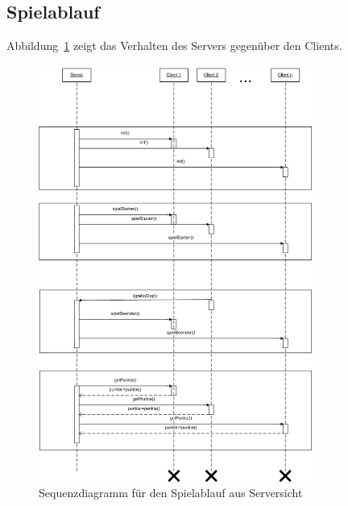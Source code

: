 \newpage

\subsection{Spielablauf}

Abbildung~\ref{SequenzdiagramServer} zeigt das Verhalten des Servers gegenüber den Clients.

\begin{figure}[H]
  \centering
  \includegraphics[width=0.80\textwidth,angle=0]{graphics/Spielablauf_Sequenzdiagramm.png}
  \caption{Sequenzdiagramm für den Spielablauf aus Serversicht\hfill{} }
  \label{SequenzdiagramServer}
\end{figure} 

